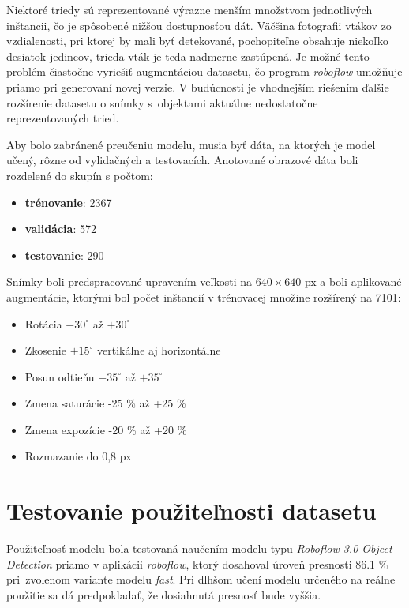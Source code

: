         Niektoré triedy sú reprezentované výrazne menším množstvom jednotlivých inštancii, čo je spôsobené nižšou dostupnosťou dát. Väčšina fotografii vtákov zo vzdialenosti, pri ktorej by mali byť detekované, pochopiteľne obsahuje niekoľko desiatok jedincov, trieda vták je teda nadmerne zastúpená. Je možné tento problém čiastočne vyriešiť augmentáciou datasetu, čo program \emph{roboflow} umožňuje priamo pri generovaní novej verzie. V budúcnosti je vhodnejším riešením ďalšie rozšírenie datasetu o snímky s~objektami aktuálne nedostatočne reprezentovaných tried.

        Aby bolo zabránené preučeniu modelu, musia byť dáta, na ktorých je model učený, rôzne od vylidačných a testovacích. Anotované obrazové dáta boli rozdelené do skupín s počtom:

        \begin{itemize}
            \item \textbf{trénovanie}: 2367
            \item \textbf{validácia}: 572
            \item \textbf{testovanie}: 290
        \end{itemize}

        Snímky boli predspracované upravením veľkosti na \(640 \times 640\) px a boli aplikované augmentácie, ktorými bol počet inštancií v trénovacej množine rozšírený na 7101:

        \begin{itemize}
            \item Rotácia \(-30^\circ\) až \(+30^\circ\)
            \item Zkosenie \(\pm 15^\circ\) vertikálne aj horizontálne
            \item Posun odtieňu \(-35^\circ\) až \(+35^\circ\)
            \item Zmena saturácie -25 \% až +25 \%
            \item Zmena expozície -20 \% až +20 \%
            \item Rozmazanie do 0,8 px
        \end{itemize}

    \section{Testovanie použiteľnosti datasetu}

    Použiteľnosť modelu bola testovaná naučením modelu typu \emph{Roboflow 3.0 Object Detection} priamo v aplikácii \emph{roboflow}, ktorý dosahoval úroveň presnosti 86.1 \% pri~zvolenom variante modelu \emph{fast}. Pri dlhšom učení modelu určeného na reálne použitie sa dá predpokladať, že dosiahnutá presnosť bude vyššia.

